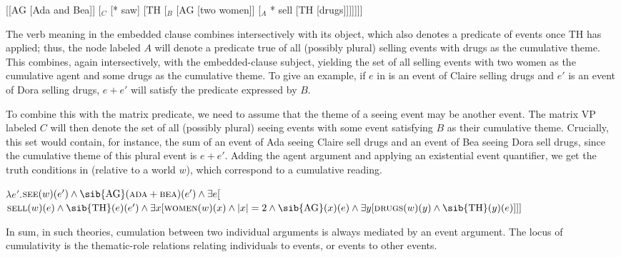 \documentclass[output=paper]{langscibook}
\begin{document}
\ea \label{has-sch:see-lf}  [[AG [Ada and Bea]] [$_C$ [* saw] [TH [$_B$ [AG [two women]] [$_A$ * sell [TH [drugs]]]]]]]\z

\noindent The verb meaning in the embedded clause combines intersectively with its object, which also denotes a predicate of events once TH has applied; thus, the node labeled $A$ will denote a predicate true of all (possibly plural) selling events with drugs as the cumulative theme. This combines, again intersectively, with the embedded-clause subject, yielding the set of all selling events with two women as the cumulative agent and some drugs as the cumulative theme. To give an example, if $e$ in  is an event of Claire selling drugs and $e'$ is an event of Dora selling drugs, $e+e'$ will satisfy the predicate expressed by $B$.

To combine this with the matrix predicate, we need to assume that the theme of a seeing event may be another event. The matrix VP labeled $C$ will then denote the set of all (possibly plural) seeing events with some event satisfying $B$ as their cumulative theme. Crucially, this set would contain, for instance, the sum of an event of Ada seeing Claire sell drugs and an event of Bea seeing Dora sell drugs, since the cumulative theme of this plural event is $e+e'$. Adding the agent argument and applying an existential event quantifier, we get the truth conditions in  (relative to a world $w$), which correspond to a cumulative reading.

\ea \label{has-sch:see-formula} $\lambda e'.$\sib{*}$\textsc{see}(w)(e') \land \text{\sib{AG}}(\textsc{ada}+\textsc{bea})(e') \land \exists e[$\sib{*}$\textsc{sell}(w)(e) \land \text{\sib{TH}}(e)(e') \land \exists x[\textsc{women}(w)(x) \land |x| = 2 \land \text{\sib{AG}}(x)(e) \land \exists y[\textsc{drugs}(w)(y) \land \text{\sib{TH}}(y)(e)]]] $
\z

\noindent In sum, in such theories, cumulation between two individual arguments is always mediated by an event argument. The locus of cumulativity is the thematic-role relations relating individuals to events, or events to other events.
\end{document}
